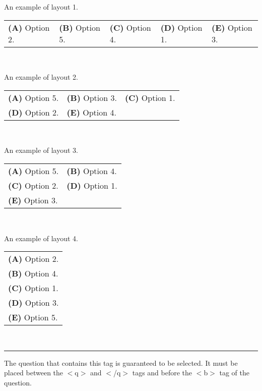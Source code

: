 \documentclass[11pt,letterpaper]{article}
\begin{document}
\begin{description}
\begin{enumerate}
\item An example of layout 1.\\
    \begin{tabular}{l l l l l}
        \textsf{\textbf{(A)} Option 2.}&
        \textsf{\textbf{(B)} Option 5.}&
        \textsf{\textbf{(C)} Option 4.}&
        \textsf{\textbf{(D)} Option 1.}&
        \textsf{\textbf{(E)} Option 3.}\\
    \end{tabular}\\
\item An example of layout 2.\\
    \begin{tabular}{l l l}
        \textsf{\textbf{(A)} Option 5.}&
        \textsf{\textbf{(B)} Option 3.}&
        \textsf{\textbf{(C)} Option 1.}\\
        \textsf{\textbf{(D)} Option 2.}&
        \textsf{\textbf{(E)} Option 4.}&
\\
    \end{tabular}\\
\item An example of layout 3.\\
    \begin{tabular}{l l}
        \textsf{\textbf{(A)} Option 5.}&
        \textsf{\textbf{(B)} Option 4.}\\
        \textsf{\textbf{(C)} Option 2.}&
        \textsf{\textbf{(D)} Option 1.}\\
        \textsf{\textbf{(E)} Option 3.}&
\\
    \end{tabular}\\
\item An example of layout 4.\\
    \begin{tabular}{p{6in}}
        \textsf{\textbf{(A)} Option 2.}\\
        \textsf{\textbf{(B)} Option 4.}\\
        \textsf{\textbf{(C)} Option 1.}\\
        \textsf{\textbf{(D)} Option 3.}\\
        \textsf{\textbf{(E)} Option 5.}\\
    \end{tabular}\\

\hspace{-1in} \rule{7in}{0.02in}
\end{enumerate}

    \item[$<$keepme$>$] The question that contains this tag is guaranteed to be selected. It must be placed between the $<$q$>$ and $<$/q$>$ tags and before the $<$b$>$ tag of the question. 
\end{description}
\end{document}
